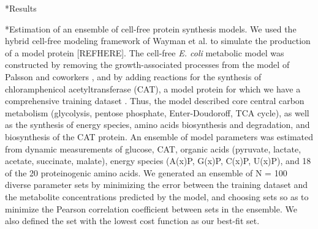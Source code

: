 \documentclass[12pt]{article}
\makeatletter
\renewcommand\subsection{\@startsection
	{subsection}{2}{0mm}
	{-0.05in}
	{-0.5\baselineskip}
	{\normalfont\normalsize\bfseries}}
\renewcommand\section{\@startsection
	{subsection}{2}{0mm}
	{-0.2in}
	{0.05\baselineskip}
	{\normalfont\large\bfseries}}
\makeatother
\begin{document}

\clearpage

\section*{Results}

\subsection*{Estimation of an ensemble of cell-free protein synthesis models.}
We used the hybrid cell-free modeling framework of Wayman et al. to simulate the production of a model protein [REFHERE].
The cell-free \textit{E. coli} metabolic model was constructed by removing the growth-associated processes from the model of Palsson and coworkers \cite{2000_edwards_palsson_PNAS}, and by adding reactions for the synthesis of chloramphenicol acetyltransferase (CAT), a model protein for which we have a comprehensive training dataset \cite{2005_calhoun_BiotechnologyProgress}.
Thus, the model described core central carbon metabolism (glycolysis, pentose phosphate, Enter-Doudoroff, TCA cycle), as well as the synthesis of energy species, amino acids biosynthesis and degradation, and biosynthesis of the CAT protein.
An ensemble of model parameters was estimated from dynamic measurements of glucose, CAT, organic acids (pyruvate, lactate, acetate, succinate, malate), energy species (A(x)P, G(x)P, C(x)P, U(x)P), and 18 of the 20 proteinogenic amino acids.
We generated an ensemble of N = 100 diverse parameter sets by minimizing the error between the training dataset and the metabolite concentrations predicted by the model, and choosing sets so as to minimize the Pearson correlation coefficient between sets in the ensemble.
We also defined the set with the lowest cost function as our best-fit set.
\end{document}
